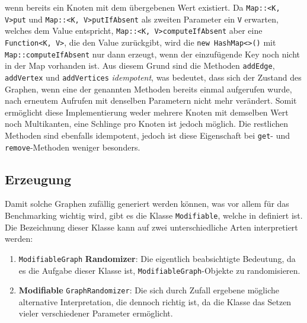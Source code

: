             wenn bereits ein Knoten mit dem übergebenen Wert existiert. Da \lstinline{Map::<K, V>put} und \lstinline{Map::<K, V>putIfAbsent} als zweiten Parameter ein \lstinline{V} erwarten, welches dem Value entspricht, \lstinline{Map::<K, V>computeIfAbsent} aber eine \lstinline{Function<K, V>}, die den Value zurückgibt, wird die \lstinline{new HashMap<>()} mit \lstinline{Map::computeIfAbsent} nur dann erzeugt, wenn der einzufügende Key noch nicht in der Map vorhanden ist. Aus diesem Grund sind die Methoden \lstinline{addEdge}, \lstinline{addVertex} und \lstinline{addVertices} \emph{idempotent}, was bedeutet, dass sich der Zustand des Graphen, wenn eine der genannten Methoden bereits einmal aufgerufen wurde, nach erneutem Aufrufen mit denselben Parametern nicht mehr verändert. Somit ermöglicht diese Implementierung weder mehrere Knoten mit demselben Wert noch Multikanten, eine Schlinge pro Knoten ist jedoch möglich. Die restlichen Methoden sind ebenfalls idempotent, jedoch ist diese Eigenschaft bei \lstinline{get}- und \lstinline{remove}-Methoden weniger besonders. \cite{EZ:Web30}

            
                
        \subsection{Erzeugung}

            Damit solche Graphen zufällig generiert werden können, was vor allem für das Benchmarking wichtig wird, gibt es die Klasse \lstinline{Modifiable}, welche in  definiert ist. Die Bezeichnung dieser Klasse kann auf zwei unterschiedliche Arten interpretiert werden:

            \begin{enumerate}
                \item \lstinline{ModifiableGraph} \textbf{Randomizer}: Die eigentlich beabsichtigte Bedeutung, da es die Aufgabe dieser Klasse ist, \lstinline{ModifiableGraph}-Objekte zu randomisieren.
            
                \item \textbf{Modifiable} \lstinline{GraphRandomizer}: Die sich durch Zufall ergebene mögliche alternative Interpretation, die dennoch richtig ist, da die Klasse das Setzen vieler verschiedener Parameter ermöglicht.
            \end{enumerate}
            
